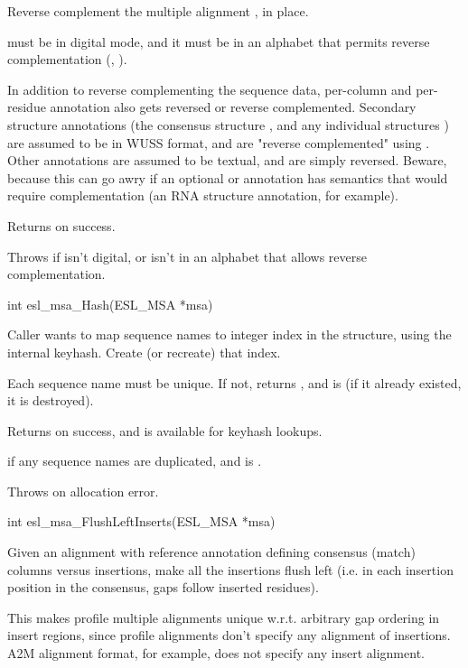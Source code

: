\begin{sreapi}
Reverse complement the multiple alignment , in place.

 must be in digital mode, and it must be in an alphabet
that permits reverse complementation (, ).

In addition to reverse complementing the sequence data,
per-column and per-residue annotation also gets reversed
or reverse complemented. Secondary structure annotations
(the consensus structure , and any individual
structures ) are assumed to be in WUSS format,
and are "reverse complemented" using
.  Other annotations are assumed to
be textual, and are simply reversed. Beware, because
this can go awry if an optional  or  annotation
has semantics that would require complementation (an RNA
structure annotation, for example).

Returns  on success.

Throws  if  isn't digital, or isn't in an alphabet 
that allows reverse complementation.


\hypertarget{func:esl_msa_Hash()}
{\item[int esl\_msa\_Hash(ESL\_MSA *msa)]}

Caller wants to map sequence names to integer index in the
 structure, using the internal  keyhash.
Create (or recreate) that index.

Each sequence name must be unique. If not, returns
, and  is  (if it already
existed, it is destroyed).

Returns  on success, and  is available for 
keyhash lookups.

 if any sequence names are duplicated, and 
 is .

Throws  on allocation error.


\hypertarget{func:esl_msa_FlushLeftInserts()}
{\item[int esl\_msa\_FlushLeftInserts(ESL\_MSA *msa)]}

Given an alignment  with reference annotation
defining consensus (match) columns versus insertions,
make all the insertions flush left (i.e. in each
insertion position in the consensus, gaps follow
inserted residues).

This makes profile multiple alignments unique w.r.t.
arbitrary gap ordering in insert regions, since profile
alignments don't specify any alignment of insertions.
A2M alignment format, for example, does not specify any
insert alignment.


\end{sreapi}
